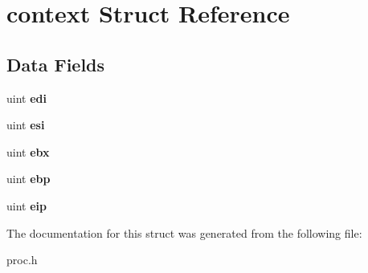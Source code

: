 \hypertarget{structcontext}{}\section{context Struct Reference}
\label{structcontext}
\subsection*{Data Fields}
\begin{DoxyCompactItemize}
\item 
uint {\bfseries edi}\hypertarget{structcontext_a9c926d583d00a615327b9b4a8fe0ab63}{}\label{structcontext_a9c926d583d00a615327b9b4a8fe0ab63}

\item 
uint {\bfseries esi}\hypertarget{structcontext_a9596ea769c8681490bbc67fd1b0abc92}{}\label{structcontext_a9596ea769c8681490bbc67fd1b0abc92}

\item 
uint {\bfseries ebx}\hypertarget{structcontext_ab1dd54ca1266e38df5943750224cd8d5}{}\label{structcontext_ab1dd54ca1266e38df5943750224cd8d5}

\item 
uint {\bfseries ebp}\hypertarget{structcontext_ac9640ddc2e90e4213ba9847bbe1b0e57}{}\label{structcontext_ac9640ddc2e90e4213ba9847bbe1b0e57}

\item 
uint {\bfseries eip}\hypertarget{structcontext_a0cfb49e5b03fd7bf12fa79d1a42be935}{}\label{structcontext_a0cfb49e5b03fd7bf12fa79d1a42be935}

\end{DoxyCompactItemize}


The documentation for this struct was generated from the following file\+:\begin{DoxyCompactItemize}
\item 
proc.\+h\end{DoxyCompactItemize}
